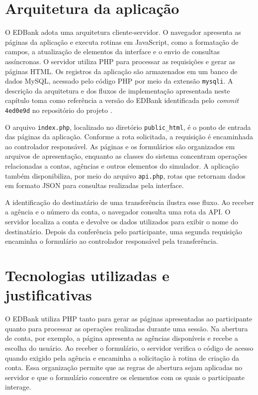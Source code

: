 \section{Arquitetura da aplicação} %
\label{cap-desenvolvimento-arquitetura}

O EDBank adota uma arquitetura cliente-servidor. O navegador
apresenta as páginas da aplicação e executa rotinas em JavaScript,
como a formatação de campos, a atualização de elementos da
interface e o envio de consultas assíncronas. O servidor utiliza
PHP para processar as requisições e gerar as páginas HTML.
Os registros da aplicação são armazenados em um banco de dados
MySQL, acessado pelo código PHP por meio da extensão
\texttt{mysqli}. A descrição da arquitetura e dos fluxos de implementação apresentada
neste capítulo toma como referência a versão do EDBank identificada
pelo \textit{commit} \texttt{4ed0e9d} no repositório do projeto
\cite{bravin2026edbank}.

O arquivo \texttt{index.php}, localizado no diretório
\texttt{public\_html}, é o ponto de entrada das páginas da
aplicação. Conforme a rota solicitada, a requisição é encaminhada
ao controlador responsável. As páginas e os formulários são
organizados em arquivos de apresentação, enquanto as classes
do sistema concentram operações relacionadas a contas, agências
e outros elementos do simulador. A aplicação também disponibiliza,
por meio do arquivo \texttt{api.php}, rotas que retornam dados em
formato JSON para consultas realizadas pela interface.

A identificação do destinatário de uma transferência ilustra esse
fluxo. Ao receber a agência e o número da conta, o navegador
consulta uma rota da API. O servidor localiza a conta e devolve
os dados utilizados para exibir o nome do destinatário. Depois
da conferência pelo participante, uma segunda requisição encaminha
o formulário ao controlador responsável pela transferência.

\section{Tecnologias utilizadas e justificativas} %
\label{cap-desenvolvimento-tecnologias}

O EDBank utiliza PHP tanto para gerar as páginas apresentadas ao
participante quanto para processar as operações realizadas durante
uma sessão. Na abertura de conta, por exemplo, a página apresenta
as agências disponíveis e recebe a escolha do usuário. Ao receber
o formulário, o servidor verifica o código de acesso quando exigido
pela agência e encaminha a solicitação à rotina de criação da conta.
Essa organização permite que as regras de abertura sejam aplicadas
no servidor e que o formulário concentre os elementos com os quais
o participante interage.

